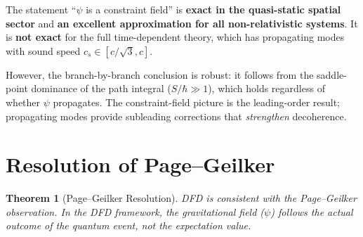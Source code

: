\documentclass[11pt,a4paper]{article}
\newtheorem{theorem}{Theorem}[section]
\begin{document}
\begin{tcolorbox}[colback=yellow!10, colframe=orange!60!black,
title=Honest Caveat: Temporal Sector]
The statement ``$\psi$ is a constraint field'' is \textbf{exact in the
quasi-static spatial sector} and \textbf{an excellent approximation for
all non-relativistic systems}. It is \textbf{not exact} for the full
time-dependent theory, which has propagating modes with sound speed
$c_s \in [c/\sqrt{3}, c]$.

However, the branch-by-branch conclusion is robust: it follows from the
saddle-point dominance of the path integral ($S/\hbar \gg 1$), which
holds regardless of whether $\psi$ propagates. The constraint-field
picture is the leading-order result; propagating modes provide
subleading corrections that \emph{strengthen} decoherence.
\end{tcolorbox}

\section{Resolution of Page--Geilker}
\label{sec:page-geilker}

\begin{theorem}[Page--Geilker Resolution]
\label{thm:page-geilker}
DFD is consistent with the Page--Geilker observation. In the DFD framework,
the gravitational field ($\psi$) follows the actual outcome of the quantum
event, not the expectation value.
\end{theorem}
\end{document}
